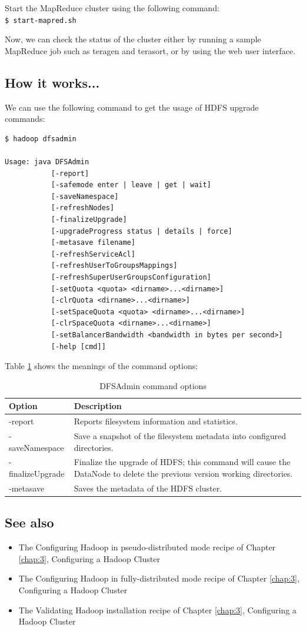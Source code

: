 Start the MapReduce cluster using the following command: \\ 
\verb|$ start-mapred.sh| 

Now, we can check the status of the cluster either by running a sample MapReduce job such as teragen and terasort, or by using the web user interface.

\subsection*{How it works...}
We can use the following command to get the usage of HDFS upgrade commands:
\lstset{style=bashstyle}
\begin{lstlisting}
$ hadoop dfsadmin

Usage: java DFSAdmin
           [-report]
           [-safemode enter | leave | get | wait]
           [-saveNamespace]
           [-refreshNodes]
           [-finalizeUpgrade]
           [-upgradeProgress status | details | force]
           [-metasave filename]
           [-refreshServiceAcl]
           [-refreshUserToGroupsMappings]
           [-refreshSuperUserGroupsConfiguration]
           [-setQuota <quota> <dirname>...<dirname>]
           [-clrQuota <dirname>...<dirname>]
           [-setSpaceQuota <quota> <dirname>...<dirname>]
           [-clrSpaceQuota <dirname>...<dirname>]
           [-setBalancerBandwidth <bandwidth in bytes per second>]
           [-help [cmd]]
\end{lstlisting}

Table \ref{tbl:dfsadmin} shows the meanings of the command options:
\begin{table}
  \centering
  \small
  \begin{tabular}{lp{}}
    \toprule 
    \textbf{Option} & \textbf{Description} \\ \midrule 
    -report & Reports filesystem information and statistics. \\ 
    -saveNamespace & Save a snapshot of the filesystem metadata into configured directories. \\
    -finalizeUpgrade & Finalize the upgrade of HDFS; this command will cause the DataNode to delete the previous version working directories. \\
    -metasave & Saves the metadata of the HDFS cluster. \\ \bottomrule 
  \end{tabular}
  \caption{DFSAdmin command options}\label{tbl:dfsadmin}
\end{table}

\subsection*{See also}
\begin{itemize}
  \item The Configuring Hadoop in pseudo-distributed mode recipe of Chapter \ref{chap:3}, Configuring a Hadoop Cluster
  \item The Configuring Hadoop in fully-distributed mode recipe of Chapter \ref{chap:3}, Configuring a Hadoop Cluster
  \item The Validating Hadoop installation recipe of Chapter \ref{chap:3}, Configuring a Hadoop Cluster
\end{itemize}
